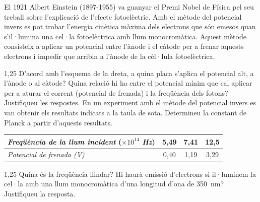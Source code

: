 El 1921 Albert Einstein (1897-1955) va guanyar el Premi Nobel de Física pel seu treball sobre l'explicació de l'efecte fotoelèctric. Amb el mètode del potencial invers es pot trobar l'energia cinètica màxima dels electrons que són emesos quan s'il·lumina una cel·la fotoelèctrica amb llum monocromàtica. Aquest mètode consisteix a aplicar un potencial entre l'ànode i el càtode per a frenar aquests electrons i impedir que arribin a l'ànode de la cèl·lula fotoelèctrica.


\begin{apartat}{1,25}
D'acord amb l'esquema de la dreta, a quina placa s'aplica el potencial alt, a l'ànode o al càtode? Quina relació hi ha entre el potencial mínim que cal aplicar per a aturar el corrent (potencial de frenada) i la freqüència dels fotons? Justifiqueu les respostes. En un experiment amb el mètode del potencial invers es van obtenir els resultats indicats a la taula de sota. Determineu la constant de Planck a partir d'aquests resultats.
\end{apartat}

\medskip
{\centering
\begin{tabular}{|l|c|c|c|}
\hline
\textit{Freqüència de la llum incident} ($\times 10^{14}$ \textit{Hz}) & 5,49 & 7,41 & 12,5 \\
\hline
\textit{Potencial de frenada (V)} & 0,40 & 1,19 & 3,29 \\
\hline
\end{tabular}\par}
\medskip

\begin{apartat}{1,25}
Quina és la freqüència llindar? Hi haurà emissió d'electrons si il·luminem la cel·la amb una llum monocromàtica d'una longitud d'ona de 350~nm? Justifiqueu la resposta.
\end{apartat}

